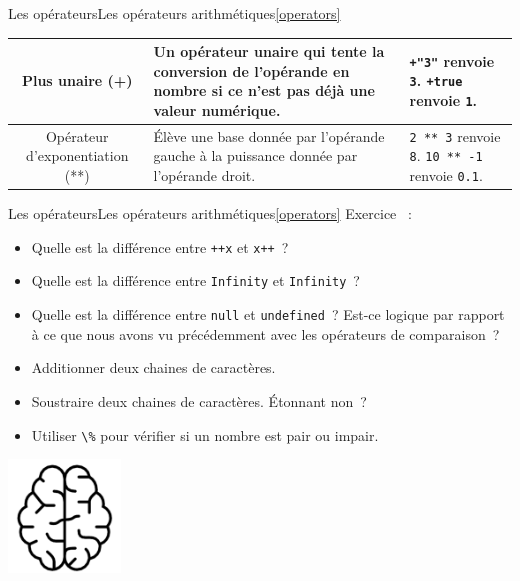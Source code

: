 \documentclass{beamer}
\begin{document}
\begin{frame}{Les opérateurs}{Les opérateurs arithmétiques\cref{operators}}
\begin{tiny}
\begin{table}[h!]
\begin{tabular}{|c|p{4cm}|p{4cm}|}
                    \hline
                    Plus unaire (+)                 & Un opérateur unaire qui tente la conversion de l'opérande en nombre si ce n'est pas déjà une valeur numérique. & \lstinline{+"3"} renvoie \lstinline{3}. \newline \lstinline{+true} renvoie \lstinline{1}. \\
                    \hline
                    Opérateur d'exponentiation (**) & Élève une base donnée par l'opérande gauche à la puissance donnée par l'opérande droit. & \lstinline{2 ** 3} renvoie \lstinline{8}. \newline \lstinline{10 ** -1} renvoie \lstinline{0.1}. \\
                    \hline
                \end{tabular}
            \end{table}
        \end{tiny}
    \end{frame}

    \begin{frame}{Les opérateurs}{Les opérateurs arithmétiques\cref{operators}}
        Exercice \execcounterdispinc{}~:
        \begin{itemize}
            \item Quelle est la différence entre \lstinline{++x} et \lstinline{x++}~?
            \item Quelle est la différence entre \lstinline{Infinity} et \lstinline{Infinity}~?
            \item Quelle est la différence entre \lstinline{null} et \lstinline{undefined}~?
            Est-ce logique par rapport à ce que nous avons vu précédemment avec les opérateurs de comparaison~?
            \item Additionner deux chaines de caractères.
            \item Soustraire deux chaines de caractères.
            Étonnant non~?
            \item Utiliser \lstinline{\%} pour vérifier si un nombre est pair ou impair.
        \end{itemize}
        \bigbreak
        \centering
        \includegraphics[width=3cm]{image/intelligence}
    \end{frame}
\end{document}

